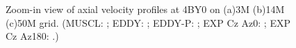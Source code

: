 \begin{figure}[t]
     \caption{Zoom-in view of axial velocity profiles at 4BY0 on (a)3M (b)14M (c)50M grid. (MUSCL: \mline; EDDY: \eline; EDDY-P: \epline; EXP Cz Az0: \bluediam; EXP Cz Az180: \reddiam.)}
     \label{zw}       
\end{figure}
